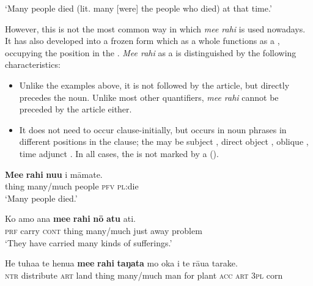 \glt
‘Many people died (lit. many [were] the people who died) at that time.’ \textstyleExampleref{[R250.093]} 
\z

However, this is not the most common way in which \textit{me{\ꞌ}e rahi} is used nowadays. It has also developed into a frozen form which as a whole functions as a , occupying the  position in the . \textit{Me{\ꞌ}e rahi} as a  is distinguished by the following characteristics:

\begin{itemize}
\item 
Unlike the examples above, it is not followed by the article, but directly precedes the noun. Unlike most other quantifiers, \textit{me{\ꞌ}e rahi} cannot be preceded by the article either.

\item 
It does not need to occur clause-initially, but occurs in noun phrases in different positions in the clause; the  may be subject , direct object , oblique , time adjunct . In all cases, the  is not marked by a  ().

\end{itemize}

\ea\label{ex:4.90}
\gll \textbf{Me{\ꞌ}e} \textbf{rahi} \textbf{nu{\ꞌ}u} i māmate. \\
thing many/much people \textsc{pfv} \textsc{pl}:die \\

\glt 
‘Many people died.’ \textstyleExampleref{[R532-05.002]}
\z

\ea\label{ex:4.91}
\gll Ko {\ꞌ}amo {\ꞌ}ana \textbf{me{\ꞌ}e} \textbf{rahi} \textbf{nō} \textbf{atu} {\ꞌ}ati. \\
\textsc{prf} carry \textsc{cont} thing many/much just away problem \\

\glt 
‘They have carried many kinds of sufferings.’ \textstyleExampleref{[1 Tim. 6:10]}
\z

\ea\label{ex:4.92}
\gll He tuha{\ꞌ}a te henua \textbf{me{\ꞌ}e} \textbf{rahi} \textbf{taŋata} mo {\ꞌ}oka i te rāua tarake. \\
\textsc{ntr} distribute \textsc{art} land thing many/much man for plant \textsc{acc} \textsc{art} \textsc{3pl} corn \\

